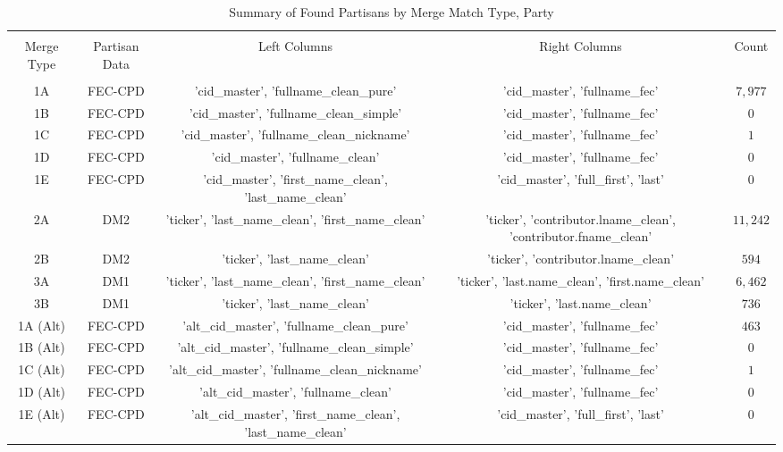 
\begin{table}[!htbp] \centering 
  \caption{Summary of Found Partisans by Merge Match Type, Party} 
  \label{} 
\scriptsize 
\begin{tabular}{@{\extracolsep{5pt}} ccccc} 
\\[-1.8ex]\hline 
\hline \\[-1.8ex] 
Merge Type & Partisan Data & Left Columns & Right Columns & Count \\ 
\hline \\[-1.8ex] 
1A & FEC-CPD & 'cid\_master', 'fullname\_clean\_pure' & 'cid\_master', 'fullname\_fec' & $7,977$ \\ 
1B & FEC-CPD & 'cid\_master', 'fullname\_clean\_simple' & 'cid\_master', 'fullname\_fec' & $0$ \\ 
1C & FEC-CPD & 'cid\_master', 'fullname\_clean\_nickname' & 'cid\_master', 'fullname\_fec' & $1$ \\ 
1D & FEC-CPD & 'cid\_master', 'fullname\_clean' & 'cid\_master', 'fullname\_fec' & $0$ \\ 
1E & FEC-CPD & 'cid\_master', 'first\_name\_clean', 'last\_name\_clean' & 'cid\_master', 'full\_first', 'last' & $0$ \\ 
2A & DM2 & 'ticker', 'last\_name\_clean', 'first\_name\_clean' & 'ticker', 'contributor.lname\_clean', 'contributor.fname\_clean' & $11,242$ \\ 
2B & DM2 & 'ticker', 'last\_name\_clean' & 'ticker', 'contributor.lname\_clean' & $594$ \\ 
3A & DM1 & 'ticker', 'last\_name\_clean', 'first\_name\_clean' & 'ticker', 'last.name\_clean', 'first.name\_clean' & $6,462$ \\ 
3B & DM1 & 'ticker', 'last\_name\_clean' & 'ticker', 'last.name\_clean' & $736$ \\ 
1A (Alt) & FEC-CPD & 'alt\_cid\_master', 'fullname\_clean\_pure' & 'cid\_master', 'fullname\_fec' & $463$ \\ 
1B (Alt) & FEC-CPD & 'alt\_cid\_master', 'fullname\_clean\_simple' & 'cid\_master', 'fullname\_fec' & $0$ \\ 
1C (Alt) & FEC-CPD & 'alt\_cid\_master', 'fullname\_clean\_nickname' & 'cid\_master', 'fullname\_fec' & $1$ \\ 
1D (Alt) & FEC-CPD & 'alt\_cid\_master', 'fullname\_clean' & 'cid\_master', 'fullname\_fec' & $0$ \\ 
1E (Alt) & FEC-CPD & 'alt\_cid\_master', 'first\_name\_clean', 'last\_name\_clean' & 'cid\_master', 'full\_first', 'last' & $0$ \\ 

\end{tabular}
\end{table}

